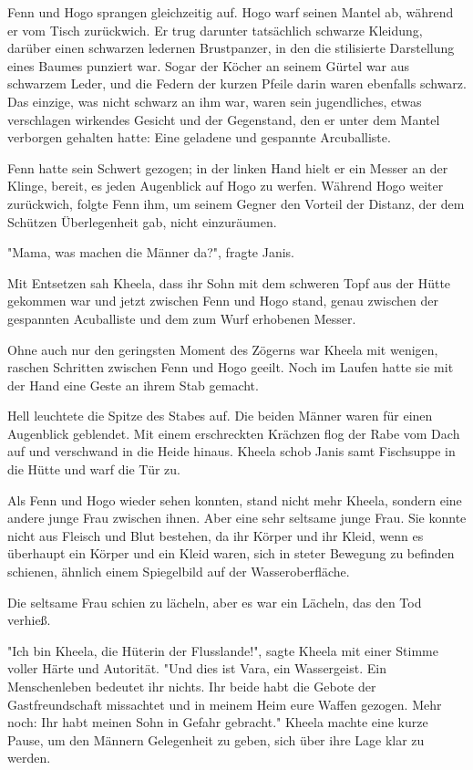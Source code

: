 \documentclass[10pt, a4paper, oneside]{book}
\begin{document}
\begin{multicols}{2}
Fenn und Hogo sprangen gleichzeitig auf. Hogo warf seinen Mantel ab, während er vom Tisch zurückwich. Er trug darunter tatsächlich schwarze Kleidung, darüber einen schwarzen ledernen Brustpanzer, in den die stilisierte Darstellung eines Baumes punziert war. Sogar der Köcher an seinem Gürtel war aus schwarzem Leder, und die Federn der kurzen Pfeile darin waren ebenfalls schwarz. Das einzige, was nicht schwarz an ihm war, waren sein jugendliches, etwas verschlagen wirkendes Gesicht und der Gegenstand, den er unter dem Mantel verborgen gehalten hatte: Eine geladene und gespannte Arcuballiste. 

Fenn hatte sein Schwert gezogen; in der linken Hand hielt er ein Messer an der Klinge, bereit, es jeden Augenblick auf Hogo zu werfen. Während Hogo weiter zurückwich, folgte Fenn ihm, um seinem Gegner den Vorteil der Distanz, der dem Schützen Überlegenheit gab, nicht einzuräumen. 

"Mama, was machen die Männer da?", fragte Janis. 

Mit Entsetzen sah Kheela, dass ihr Sohn mit dem schweren Topf aus der Hütte gekommen war und jetzt zwischen Fenn und Hogo stand, genau zwischen der gespannten Acuballiste und dem zum Wurf erhobenen Messer.\bigskip

Ohne auch nur den geringsten Moment des Zögerns war Kheela mit wenigen, raschen Schritten zwischen Fenn und Hogo geeilt. Noch im Laufen hatte sie mit der Hand eine Geste an ihrem Stab gemacht. 

Hell leuchtete die Spitze des Stabes auf. Die beiden Männer waren für einen Augenblick geblendet. Mit einem erschreckten Krächzen flog der Rabe vom Dach auf und verschwand in die Heide hinaus. Kheela schob Janis samt Fischsuppe in die Hütte und warf die Tür zu. 

Als Fenn und Hogo wieder sehen konnten, stand nicht mehr Kheela, sondern eine andere junge Frau zwischen ihnen. Aber eine sehr seltsame junge Frau. Sie konnte nicht aus Fleisch und Blut bestehen, da ihr Körper und ihr Kleid, wenn es überhaupt ein Körper und ein Kleid waren, sich in steter Bewegung zu befinden schienen, ähnlich einem Spiegelbild auf der Wasseroberfläche. 

Die seltsame Frau schien zu lächeln, aber es war ein Lächeln, das den Tod verhieß. 

"Ich bin Kheela, die Hüterin der Flusslande!", sagte Kheela mit einer Stimme voller Härte und Autorität. "Und dies ist Vara, ein Wassergeist. Ein Menschenleben bedeutet ihr nichts. Ihr beide habt die Gebote der Gastfreundschaft missachtet und in meinem Heim eure Waffen gezogen. Mehr noch: Ihr habt meinen Sohn in Gefahr gebracht." Kheela machte eine kurze Pause, um den Männern Gelegenheit zu geben, sich über ihre Lage klar zu werden. 


\end{multicols}
\end{document}
